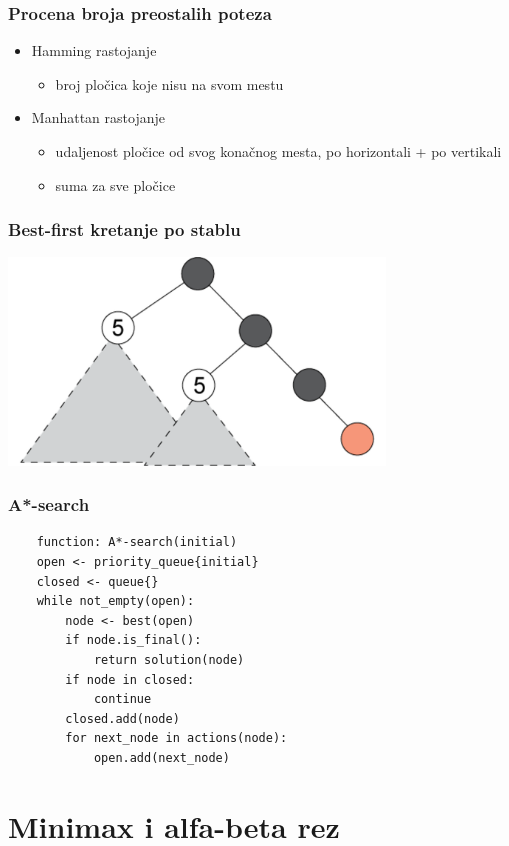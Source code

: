 \documentclass[compress,aspectratio=169]{beamer}
\begin{document}
\begin{frame}[fragile]
  \frametitle{Procena broja preostalih poteza}
  \begin{itemize}
    \item Hamming rastojanje
    \begin{itemize}
      \item broj pločica koje nisu na svom mestu
    \end{itemize}
    \item Manhattan rastojanje
    \begin{itemize}
      \item udaljenost pločice od svog konačnog mesta, po horizontali + po vertikali
      \item suma za sve pločice
    \end{itemize}
  \end{itemize}
\end{frame}

\begin{frame}[fragile]
  \frametitle{Best-first kretanje po stablu}
  \begin{center}
    \includegraphics[width=10cm]{prj-01-pic06.png}
  \end{center}
\end{frame}

\begin{frame}[fragile]
  \frametitle{A*-search}
  \begin{verbatim}
    function: A*-search(initial)
    open <- priority_queue{initial}
    closed <- queue{}
    while not_empty(open):
        node <- best(open)
        if node.is_final():
            return solution(node)
        if node in closed:
            continue
        closed.add(node)
        for next_node in actions(node):
            open.add(next_node)    
  \end{verbatim}
\end{frame}

\section{Minimax i alfa-beta rez}
\end{document}
